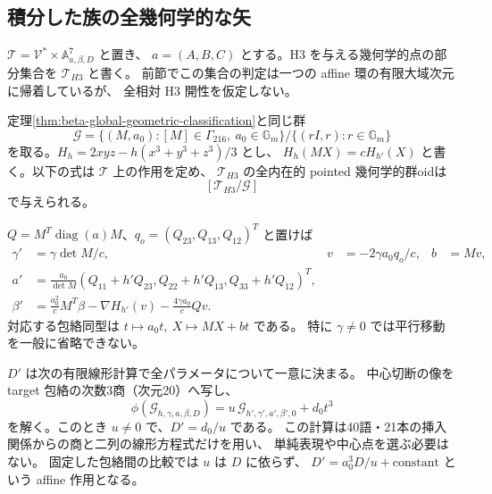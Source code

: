 \subsection{積分した族の全幾何学的な矢}
\label{subsec:integrated-full-arrows}
$\mathcal T=\mathcal V^*\times\mathbb A^7_{a,\beta,D}$ と置き、
$a=(A,B,C)$ とする。H3 を与える幾何学的点の部分集合を $\mathcal T_{H3}$ と書く。
前節でこの集合の判定は一つの affine 環の有限大域次元に帰着しているが、
全相対 H3 開性を仮定しない。

\begin{theorem}[指定chartの全比較写像と中心値の有限線形計算]
\label{thm:integrated-full-arrows}
定理\ref{thm:beta-global-geometric-classification}と同じ群
\[
 \mathcal G=\{(M,a_0):[M]\in\Gamma_{216},\ a_0\in\mathbb G_m\}
              /\{(rI,r):r\in\mathbb G_m\}
\]
を取る。$H_h=2xyz-h(x^3+y^3+z^3)/3$ とし、
$H_h(MX)=cH_{h'}(X)$ と書く。以下の式は $\mathcal T$ 上の作用を定め、
$\mathcal T_{H3}$ の全内在的 pointed 幾何学的群oidは
\[
 [\mathcal T_{H3}/\mathcal G]
\]
で与えられる。

$Q=M^T\operatorname{diag}(a)M$、$q_o=(Q_{23},Q_{13},Q_{12})^T$ と置けば
\begin{align*}
 \gamma'&=\gamma\det M/c,&
 v&=-2\gamma a_0q_o/c,& b&=Mv,\\
 a'&=\frac{a_0}{\det M}
 (Q_{11}+h'Q_{23},Q_{22}+h'Q_{13},Q_{33}+h'Q_{12})^T,\\
 \beta'&=\frac{a_0^2}{c}M^T\beta
       -\nabla H_{h'}(v)-\frac{4\gamma a_0}{c}Qv.
\end{align*}
対応する包絡同型は $t\mapsto a_0t,\ X\mapsto MX+bt$ である。
特に $\gamma\ne0$ では平行移動を一般に省略できない。

$D'$ は次の有限線形計算で全パラメータについて一意に決まる。
中心切断の像を target 包絡の次数3商（次元20）へ写し、
\begin{equation}\label{eq:integrated-D-linear-solve}
 \phi(\mathcal G_{h,\gamma,a,\beta,D})
   =u\,\mathcal G_{h',\gamma',a',\beta',0}+d_0t^3
\end{equation}
を解く。このとき $u\ne0$ で、$D'=d_0/u$ である。
この計算は40語・21本の挿入関係からの商と二列の線形方程式だけを用い、
単純表現や中心点を選ぶ必要はない。
固定した包絡間の比較では $u$ は $D$ に依らず、
$D'=a_0^3D/u+\text{constant}$ という affine 作用となる。
\end{theorem}


